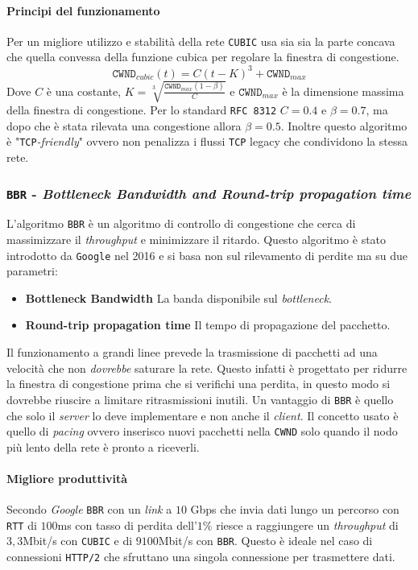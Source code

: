             \paragraph{Principi del funzionamento} Per un migliore utilizzo e stabilità della rete \texttt{CUBIC} usa sia sia la parte concava che quella convessa della funzione cubica per regolare la finestra di congestione. 
            $$
                \texttt{CWND}_{cubic}(t) = C(t-K)^3 + \texttt{CWND}_{max}
            $$
            Dove $ C $ è una costante, $ K = \sqrt[3]{\frac{\texttt{CWND}_{max}(1-\beta)}{C}} $ e $ \texttt{CWND}_{max} $ è la dimensione massima della finestra di congestione. Per lo standard \texttt{RFC 8312} $ C = 0.4 $ e $ \beta = 0.7 $, ma dopo che è stata rilevata una congestione allora $ \beta = 0.5 $. Inoltre questo algoritmo è "\texttt{TCP}\textit{-friendly}" ovvero non penalizza i flussi \texttt{TCP} legacy che condividono la stessa rete.
        \subsubsection{\texttt{BBR} - \textit{Bottleneck Bandwidth and Round-trip propagation time}}
            L'algoritmo \texttt{BBR} è un algoritmo di controllo di congestione che cerca di massimizzare il \textit{throughput} e minimizzare il ritardo. Questo algoritmo è stato introdotto da \texttt{Google} nel 2016 e si basa non sul rilevamento di perdite ma su due parametri: \begin{itemize}
                \item \textbf{Bottleneck Bandwidth} La banda disponibile sul \textit{bottleneck}.
                \item \textbf{Round-trip propagation time} Il tempo di propagazione del pacchetto.
            \end{itemize}
            Il funzionamento a grandi linee prevede la trasmissione di pacchetti ad una velocità che non \textit{dovrebbe} saturare la rete. Questo infatti è progettato per ridurre la finestra di congestione prima che si verifichi una perdita, in questo modo si dovrebbe riuscire a limitare ritrasmissioni inutili. Un vantaggio di \texttt{BBR} è quello che solo il \textit{server} lo deve implementare e non anche il \textit{client}. Il concetto usato è quello di \textit{pacing} ovvero inserisco nuovi pacchetti nella \texttt{CWND} solo quando il nodo più lento della rete è pronto a riceverli.
            \paragraph{Migliore produttività} Secondo \textit{Google} \texttt{BBR} con un \textit{link} a $10$ Gbps che invia dati lungo un percorso con \texttt{RTT} di $100$ms con tasso di perdita dell'$1\%$ riesce a raggiungere un \textit{throughput} di $3,3$Mbit/s con \texttt{CUBIC} e di $9100$Mbit/s con \texttt{BBR}. Questo è ideale nel caso di connessioni \texttt{HTTP/2} che sfruttano una singola connessione per trasmettere dati.
